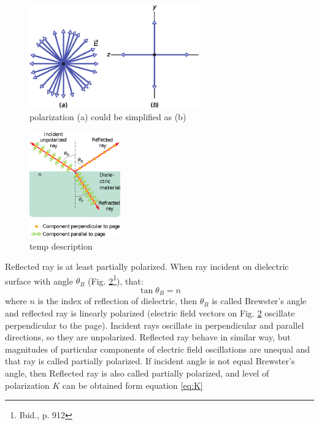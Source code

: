 \documentclass[a4paper,12pt]{article}
\begin{document}
\begin{figure}[ht]
    \begin{center}
        \includegraphics[width=0.65\textwidth]{simplified_polarization}
        \caption{polarization (a) could be simplified as (b)}
        \label{fig:sp}
    \end{center}
\end{figure}
\begin{figure}[ht]
\begin{center}
    \includegraphics[width=0.35\textwidth]{brewster}
    \caption{temp description}
    \label{fig:brewang}
\end{center}
\end{figure}
Reflected ray is at least partially polarized. When ray incident on dielectric surface with angle $\theta_B$ (Fig. \ref{fig:brewang}\footnote{Ibid., p. 912}), that:
\begin{equation}
    \tan \theta_B = n \label{eq:brew_ang}
\end{equation}
where $n$ is the index of reflection of dielectric, then $\theta_B$ is called Brewster's angle and reflected ray is linearly polarized (electric field vectors on Fig. \ref{fig:brewang} oscillate perpendicular to the page). Incident rays oscillate in perpendicular and parallel directions, so they are unpolarized. Reflected ray behave in similar way, but magnitudes of particular components of electric field oscillations are unequal and that ray is called partially polarized. If incident angle is not equal Brewster's angle, then Reflected ray is also called partially polarized, and level of polarization $K$ can be obtained form equation \ref{eq:K}
\end{document}
